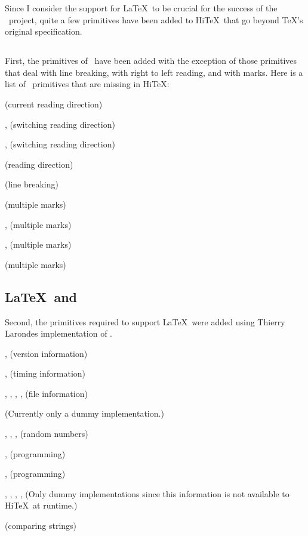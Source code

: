 Since I consider the support for \LaTeX\ to be crucial for
the success of the \HINT\ project, quite a few primitives
have been added to Hi\TeX\ that go beyond \TeX's original
specification. 

\subsection{\eTeX}
First, the primitives of \eTeX\ have been
added with the exception of those primitives that deal with
line breaking, with right to left reading, and with marks. 
Here is a list of \eTeX\ primitives that are missing in Hi\TeX:
\itemize
\item{} (current reading direction)
\item{},   (switching reading direction)
\item{},  (switching reading direction)
\item{}  (reading direction)
\item{}  (line breaking)
\item{}  (multiple marks)
\item{},    (multiple marks)
\item{},   (multiple marks)
\item{}  (multiple marks)
\enditemize 

\subsection{\LaTeX\ and \Prote}
Second, the primitives required to support
\LaTeX\ were added using Thierry Larondes implementation of \Prote.

\itemize
\item{},  (version information)
\item{},  (timing information)
\item{}, , ,
     ,  (file information)
\item{} (Currently only a dummy implementation.)
\item{}, ,
     ,  (random numbers)
\item{},  (programming)
\item{},   (programming)
\item{}, , , ,
      (Only dummy implementations since this information
      is not available to Hi\TeX\ at runtime.)
\item{} (comparing strings)
\enditemize 


